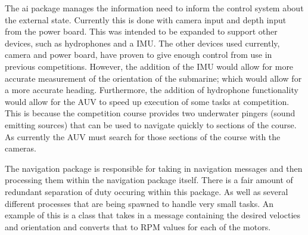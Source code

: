 The ai package manages the information need to inform the control system about
the external state.
Currently this is done with camera input and depth input
from the power board.
This was intended to be expanded to support other devices,
such as hydrophones and a \gls{IMU}.
The other devices used currently, camera and power board, have proven to give
enough control from use in previous competitions.
However, the addition of the IMU would allow for more accurate measurement of
the orientation of the submarine; which would allow for a more accurate heading.
Furthermore, the addition of hydrophone functionality would allow for the AUV to
speed up execution of some tasks at competition.
This is because the competition course provides two underwater pingers (sound
emitting sources) that can be used to navigate quickly to sections of the
course.
As currently the AUV must search for those sections of the course with the
cameras.

The navigation package is responsible for taking in navigation messages and
then processing them within the navigation package itself.
There is a fair amount of redundant separation of duty occuring within this
package.
As well as several different processes that are being spawned to handle
very small tasks.
An example of this is a class that takes in a message containing the desired
velocties and orientation and converts that to \gls{RPM} values for each of the
motors.

